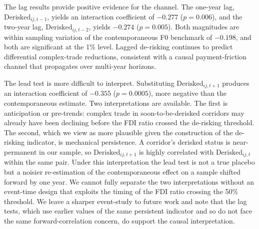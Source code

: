 \begin{table}[htbp]
\centering
\caption{Endogeneity: Lag and Lead Specifications}
\label{tab:endogeneity_panel}
\begin{threeparttable}
\small

\begin{tablenotes}
\end{tablenotes}
\end{threeparttable}
\end{table}

The lag results provide positive evidence for the channel. The one-year lag, $\text{Derisked}_{ij,t-1}$, yields an interaction coefficient of $-0.277$ ($p = 0.006$), and the two-year lag, $\text{Derisked}_{ij,t-2}$, yields $-0.274$ ($p = 0.005$). Both magnitudes are within sampling variation of the contemporaneous F0 benchmark of $-0.198$, and both are significant at the 1\% level. Lagged de-risking continues to predict differential complex-trade reductions, consistent with a causal payment-friction channel that propagates over multi-year horizons.

The lead test is more difficult to interpret. Substituting $\text{Derisked}_{ij,t+1}$ produces an interaction coefficient of $-0.355$ ($p = 0.0005$), more negative than the contemporaneous estimate. Two interpretations are available. The first is anticipation or pre-trends: complex trade in soon-to-be-derisked corridors may already have been declining before the FDI ratio crossed the de-risking threshold. The second, which we view as more plausible given the construction of the de-risking indicator, is mechanical persistence. A corridor's derisked status is near-permanent in our sample, so $\text{Derisked}_{ij,t+1}$ is highly correlated with $\text{Derisked}_{ij,t}$ within the same pair. Under this interpretation the lead test is not a true placebo but a noisier re-estimation of the contemporaneous effect on a sample shifted forward by one year. We cannot fully separate the two interpretations without an event-time design that exploits the timing of the FDI ratio crossing the 50\% threshold. We leave a sharper event-study to future work and note that the lag tests, which use earlier values of the same persistent indicator and so do not face the same forward-correlation concern, do support the causal interpretation.

